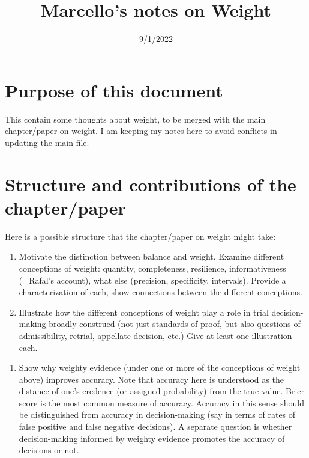 \documentclass[
  10pt,
  dvipsnames,enabledeprecatedfontcommands]{scrartcl}
\title{Marcello's notes on Weight}
\author{}
\date{\vspace{-2.5em}9/1/2022}
\providecommand{\tightlist}{%
  \setlength{\itemsep}{0pt}\setlength{\parskip}{0pt}}
\begin{document}
\maketitle

\hypertarget{purpose-of-this-document}{%
\section{Purpose of this document}\label{purpose-of-this-document}}

This contain some thoughts about weight, to be merged with the main
chapter/paper on weight. I am keeping my notes here to avoid conflicts
in updating the main file.

\hypertarget{structure-and-contributions-of-the-chapterpaper}{%
\section{Structure and contributions of the
chapter/paper}\label{structure-and-contributions-of-the-chapterpaper}}

Here is a possible structure that the chapter/paper on weight might
take:

\begin{enumerate}
\def\labelenumi{(\arabic{enumi})}
\item
  Motivate the distinction between balance and weight. Examine different
  conceptions of weight: quantity, completeness, resilience,
  informativeness (=Rafal's account), what else (precision, specificity,
  intervals). Provide a characterization of each, show connections
  between the different conceptions.
\item
  Illustrate how the different conceptions of weight play a role in
  trial decision-making broadly construed (not just standards of proof,
  but also questions of admissibility, retrial, appellate decision,
  etc.) Give at least one illustration each.
\end{enumerate}


\begin{enumerate}
\def\labelenumi{(\arabic{enumi})}
\setcounter{enumi}{2}
\tightlist
\item
  Show why weighty evidence (under one or more of the conceptions of
  weight above) improves accuracy. Note that accuracy here is understood
  as the distance of one's credence (or assigned probability) from the
  true value. Brier score is the most common measure of accuracy.
  Accuracy in this sense should be distinguished from accuracy in
  decision-making (say in terms of rates of false positive and false
  negative decisions). A separate question is whether decision-making
  informed by weighty evidence promotes the accuracy of decisions or
  not.
\end{enumerate}
\end{document}
